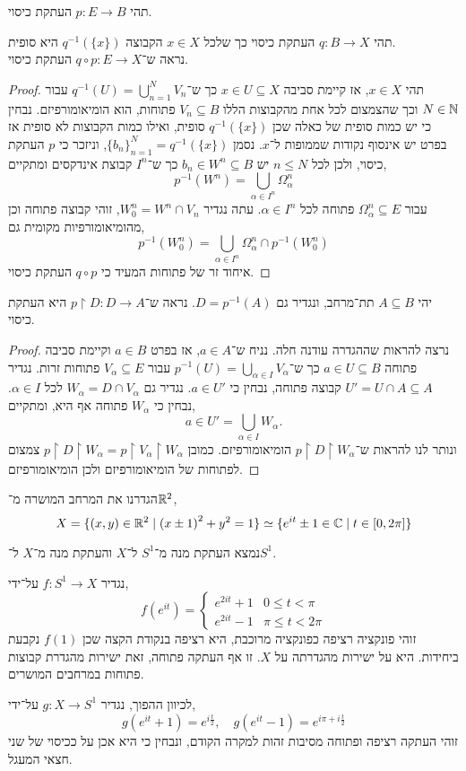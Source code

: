\question{}
תהי $p : E \to B$ העתקת כיסוי.

\subquestion{}
תהי $q : B \to X$ העתקת כיסוי כך שלכל $x \in X$ הקבוצה $q^{-1}(\{x\})$ היא סופית. \\
נראה ש־$q \circ p : E \to X$ העתקת כיסוי.
\begin{proof}
	תהי $x \in X$, אז קיימת סביבה $x \in U \subseteq X$ כך ש־$q^{-1}(U) = \bigcup_{n = 1}^N V_n$ עבור $N \in \mathbb{N}$ וכך שהצמצום לכל אחת מהקבוצות הללו $V_n \subseteq B$ פתוחות, הוא הומיאומורפיזם.
	נבחין כי יש כמות סופית של כאלה שכן $q^{-1}(\{ x \})$ סופית, ואילו כמות הקבוצות לא סופית אז בפרט יש אינסוף נקודות שממופות ל־$x$.
	נסמן ${\{ b_n \}}_{n = 1}^N = q^{-1}(\{ x \})$, וניזכר כי $p$ העתקת כיסוי, ולכן לכל $n \le N$ יש $b_n \in W^n \subseteq B$ כך ש־$I^n$ קבוצת אינדקסים ומתקיים,
	\[
		p^{-1}(W^n) = \bigcup_{\alpha \in I^n} \Omega_{\alpha}^n
	\]
	עבור $\Omega_{\alpha}^n \subseteq E$ פתוחה לכל $\alpha \in I^n$.
	עתה נגדיר $W_0^n = W^n \cap V_n$, זוהי קבוצה פתוחה וכן מהומיאומורפיות מקומית גם,
	\[
		p^{-1}(W_0^n)
		= \bigcup_{\alpha \in I^n} \Omega_{\alpha}^n \cap p^{-1}(W_0^n)
	\]
	איחוד זר של פתוחות המעיד כי $q \circ p$ העתקת כיסוי.
\end{proof}

\subquestion{}
יהי $A \subseteq B$ תת־מרחב, ונגדיר גם $D = p^{-1}(A)$.
נראה ש־$p \restriction D : D \to A$ היא העתקת כיסוי.
\begin{proof}
	נרצה להראות שההגדרה עודנה חלה.
	נניח ש־$a \in A$, אז בפרט $a \in B$ וקיימת סביבה פתוחה $a \in U \subseteq B$ כך ש־$p^{-1}(U) = \bigcup_{\alpha \in I} V_{\alpha}$ עבור $V_{\alpha} \subseteq E$ פתוחות זרות.
	נגדיר $U' = U \cap A \subseteq A$ קבוצה פתוחה, נבחין כי $a \in U'$.
	נגדיר גם $W_{\alpha} = D \cap V_{\alpha}$ לכל $\alpha \in I$.
	נבחין כי $W_{\alpha}$ פתוחה אף היא, ומתקיים,
	\[
		a \in U'
		= \bigcup_{\alpha \in I} W_{\alpha}
	.\]
	ונותר לנו להראות ש־$p \restriction D \restriction W_{\alpha}$ הומיאומורפיזם.
	כמובן $p \restriction D \restriction W_{\alpha} = p \restriction V_{\alpha} \restriction W_{\alpha}$ צמצום לפתוחות של הומיאומורפיזם ולכן הומיאומורפיזם.
\end{proof}

\question{}
הגדרנו את המרחב המושרה מ־$\mathbb{R}^2$,
\[
	X
	= \{ (x, y) \in \mathbb{R}^2 \mid {(x \pm 1)}^2 + y^2 = 1 \}
	\simeq \{ e^{it} \pm 1 \in \mathbb{C} \mid t \in [0, 2 \pi] \}
\]

\subquestion{}
נמצא העתקת מנה מ־$S^1$ ל־$X$ והעתקת מנה מ־$X$ ל־$S^1$.
\begin{solution}
	נגדיר $f : S^1 \to X$ על־ידי,
	\[
		f(e^{it})
		= \begin{cases}
			e^{2 i t} + 1 & 0 \le t < \pi \\
			e^{2 i t} - 1 & \pi \le t < 2\pi
		\end{cases}
	\]
	זוהי פונקציה רציפה כפונקציה מרוכבת,
	היא רציפה בנקודת הקצה שכן $f(1)$ נקבעת ביחידות.
	היא על ישירות מהגדרתה על $X$.
	זו אף העתקה פתוחה, זאת ישירות מהגדרת קבוצות פתוחות במרחבים המושרים.

	לכיוון ההפוך, נגדיר $g : X \to S^1$ על־ידי,
	\[
		g(e^{it} + 1)
		= e^{i \frac{t}{2}},
		\quad
		g(e^{it} - 1)
		= e^{i \pi + i \frac{t}{2}}
	\]
	זוהי העתקה רציפה ופתוחה מסיבות זהות למקרה הקודם, ונבחין כי היא אכן על ככיסוי של שני חצאי המעגל.
\end{solution}

